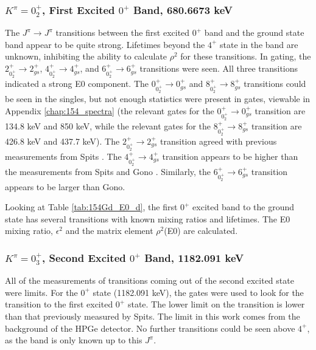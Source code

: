 \afterpage{}

\afterpage{\clearpage}

\afterpage{\clearpage}

\subsubsection{$K^{\pi}=0^+_2$, First Excited $0^+$ Band, 680.6673 keV}

The $J^{\pi}\rightarrow J^{\pi}$ transitions between the first excited $0^+$ band and the ground state band appear to be quite strong. Lifetimes beyond the $4^+$ state in the band are unknown, inhibiting the ability to calculate $\rho^2$ for these transitions. In gating, the $2^+_{0^+_2}\rightarrow 2^+_{gs}$, $4^+_{0^+_2}\rightarrow 4^+_{gs}$, and $6^+_{0^+_2}\rightarrow 6^+_{gs}$ transitions were seen. All three transitions indicated a strong E0 component. The $0^+_{0^+_2}\rightarrow 0^+_{gs}$ and $8^+_{0^+_2}\rightarrow 8^+_{gs}$ transitions could be seen in the singles, but not enough statistics were present in gates, viewable in Appendix \ref{chap:154_spectra} (the relevant gates for the $0^+_{0^+_2}\rightarrow 0^+_{gs}$ transition are 134.8 keV and 850 keV, while the relevant gates for the $8^+_{0^+_2}\rightarrow 8^+_{gs}$ transition are 426.8 keV and 437.7 keV). The $2^+_{0^+_2}\rightarrow 2^+_{gs}$ transition agreed with previous measurements from Spits \citep{spits96:_154gd}. The $4^+_{0^+_2}\rightarrow 4^+_{gs}$ transition appears to be higher than the measurements from Spits and Gono \citep{gono74:_154gd_e0}. Similarly, the $6^+_{0^+_2}\rightarrow 6^+_{gs}$ transition appears to be larger than Gono.

Looking at Table \ref{tab:154Gd_E0_d}, the first $0^+$ excited band to the ground state has several transitions with known mixing ratios and lifetimes. The E0 mixing ratio, $\epsilon^2$ and the matrix element $\rho^2$(E0) are calculated.

\subsubsection{$K^{\pi}=0^+_3$, Second Excited $0^+$ Band, 1182.091 keV}

All of the measurements of transitions coming out of the second excited state were limits. For the $0^+$ state (1182.091 keV), the gates were used to look for the transition to the first excited $0^+$ state. The lower limit on the transition is lower than that previously measured by Spits. The limit in this work comes from the background of the HPGe detector. No further transitions could be seen above $4^+$, as the band is only known up to this $J^{\pi}$.

